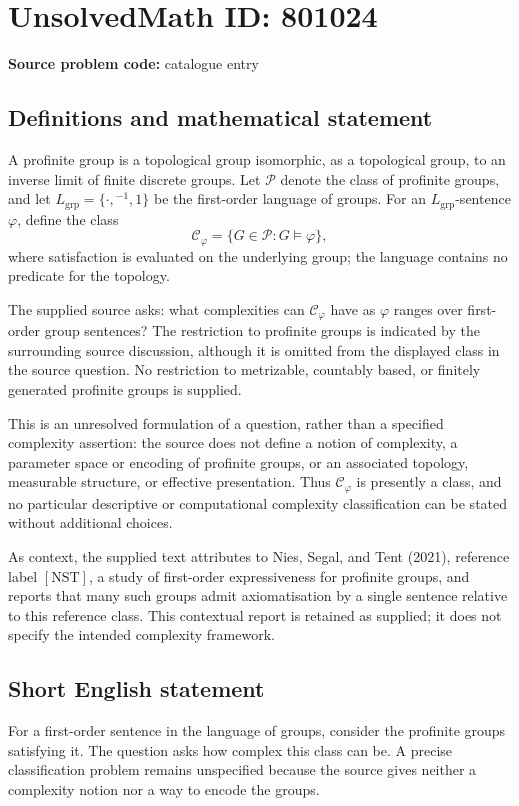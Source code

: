 \documentclass[11pt]{article}
\begin{document}
\section*{UnsolvedMath ID: 801024}
\textbf{Source problem code:} catalogue entry
\subsection{Definitions and mathematical statement}
A profinite group is a topological group isomorphic, as a topological group, to an inverse limit of finite discrete groups. Let \(\mathcal P\) denote the class of profinite groups, and let \(L_{\mathrm{grp}}=\{\cdot,{}^{-1},1\}\) be the first-order language of groups. For an \(L_{\mathrm{grp}}\)-sentence \(\varphi\), define the class
\[
\mathcal C_\varphi=\{G\in\mathcal P:G\models\varphi\},
\]
where satisfaction is evaluated on the underlying group; the language contains no predicate for the topology.

The supplied source asks: what complexities can \(\mathcal C_\varphi\) have as \(\varphi\) ranges over first-order group sentences? The restriction to profinite groups is indicated by the surrounding source discussion, although it is omitted from the displayed class in the source question. No restriction to metrizable, countably based, or finitely generated profinite groups is supplied.

This is an unresolved formulation of a question, rather than a specified complexity assertion: the source does not define a notion of complexity, a parameter space or encoding of profinite groups, or an associated topology, measurable structure, or effective presentation. Thus \(\mathcal C_\varphi\) is presently a class, and no particular descriptive or computational complexity classification can be stated without additional choices.

As context, the supplied text attributes to Nies, Segal, and Tent (2021), reference label \([\mathrm{NST}]\), a study of first-order expressiveness for profinite groups, and reports that many such groups admit axiomatisation by a single sentence relative to this reference class. This contextual report is retained as supplied; it does not specify the intended complexity framework.
\subsection{Short English statement}
For a first-order sentence in the language of groups, consider the profinite groups satisfying it. The question asks how complex this class can be. A precise classification problem remains unspecified because the source gives neither a complexity notion nor a way to encode the groups.
\end{document}
